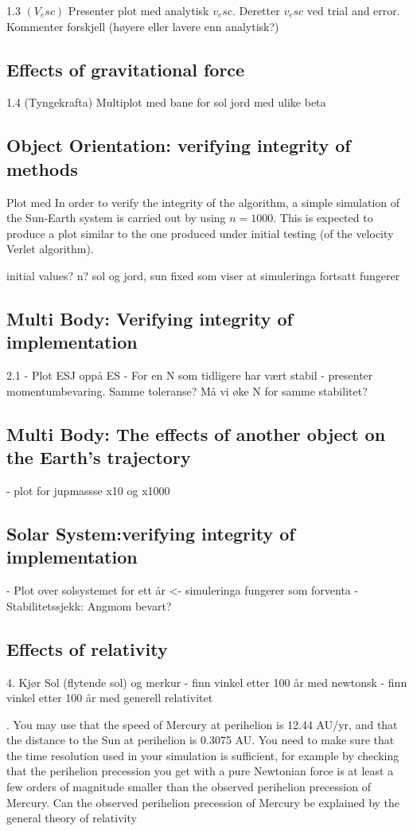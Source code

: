 \documentclass[%
oneside,                 %
final,                   %
10pt]{article}
\begin{document}
1.3 $(V_esc)$ Presenter plot med analytisk $v_esc.$ Deretter $v_esc$ ved trial and error. Kommenter forskjell (høyere eller lavere enn analytisk?)
\subsection{Effects of gravitational force}
1.4 (Tyngekrafta)  Multiplot med bane for sol jord med ulike beta


\subsection{Object Orientation: verifying integrity of methods} Plot med In order to verify the integrity of the algorithm, a simple simulation of the Sun-Earth system is carried out by using $n=1000$. This is expected to produce a plot similar to the one produced under initial testing (of the velocity Verlet algorithm).

initial values? n?
sol og jord, sun fixed som viser at simuleringa fortsatt fungerer
\subsection{Multi Body: Verifying integrity of implementation }

2.1 - Plot ESJ oppå ES
    - For en N som tidligere har vært stabil - presenter momentumbevaring. Samme toleranse? Må vi øke N for samme stabilitet?
\subsection{Multi Body: The effects of another object on the Earth's trajectory}
    - plot for jupmassse x10 og x1000

\subsection{Solar System:verifying integrity of implementation }
- Plot over solsystemet for ett år <- simuleringa fungerer som forventa
- Stabilitetssjekk: Angmom bevart? 

\subsection{Effects of relativity}
4. Kjør Sol (flytende sol) og merkur 
- finn vinkel etter 100 år med newtonsk
- finn vinkel etter 100 år med generell relativitet

. You may use that the speed of Mercury
at perihelion is 12.44 AU/yr, and that the distance to the Sun at perihelion
is 0.3075 AU.
You need to make sure that the time resolution used in your
simulation is sufficient, for example by checking that the perihelion precession
you get with a pure Newtonian force is at least a few orders of magnitude smaller
than the observed perihelion precession of Mercury. Can the observed perihelion
precession of Mercury be explained by the general theory of relativity
\end{document}
